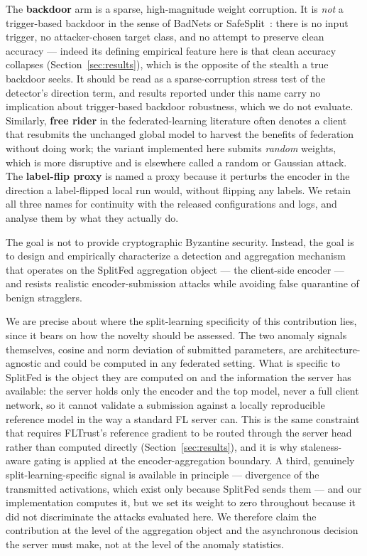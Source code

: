 \documentclass[pdflatex,sn-mathphys-num]{sn-jnl}
\begin{document}
The \textbf{backdoor} arm is a sparse, high-magnitude weight corruption. It is \emph{not} a trigger-based backdoor in the sense of BadNets or SafeSplit~\cite{safesplit2025}: there is no input trigger, no attacker-chosen target class, and no attempt to preserve clean accuracy --- indeed its defining empirical feature here is that clean accuracy collapses (Section~\ref{sec:results}), which is the opposite of the stealth a true backdoor seeks. It should be read as a sparse-corruption stress test of the detector's direction term, and results reported under this name carry no implication about trigger-based backdoor robustness, which we do not evaluate. Similarly, \textbf{free rider} in the federated-learning literature often denotes a client that resubmits the unchanged global model to harvest the benefits of federation without doing work; the variant implemented here submits \emph{random} weights, which is more disruptive and is elsewhere called a random or Gaussian attack. The \textbf{label-flip proxy} is named a proxy because it perturbs the encoder in the direction a label-flipped local run would, without flipping any labels. We retain all three names for continuity with the released configurations and logs, and analyse them by what they actually do.

The goal is not to provide cryptographic Byzantine security. Instead, the goal is to design and empirically characterize a detection and aggregation mechanism that operates on the SplitFed aggregation object --- the client-side encoder --- and resists realistic encoder-submission attacks while avoiding false quarantine of benign stragglers.

We are precise about where the split-learning specificity of this contribution lies, since it bears on how the novelty should be assessed. The two anomaly signals themselves, cosine and norm deviation of submitted parameters, are architecture-agnostic and could be computed in any federated setting. What is specific to SplitFed is the object they are computed on and the information the server has available: the server holds only the encoder and the top model, never a full client network, so it cannot validate a submission against a locally reproducible reference model in the way a standard FL server can. This is the same constraint that requires FLTrust's reference gradient to be routed through the server head rather than computed directly (Section~\ref{sec:results}), and it is why staleness-aware gating is applied at the encoder-aggregation boundary. A third, genuinely split-learning-specific signal is available in principle --- divergence of the transmitted activations, which exist only because SplitFed sends them --- and our implementation computes it, but we set its weight to zero throughout because it did not discriminate the attacks evaluated here. We therefore claim the contribution at the level of the aggregation object and the asynchronous decision the server must make, not at the level of the anomaly statistics.
\end{document}
